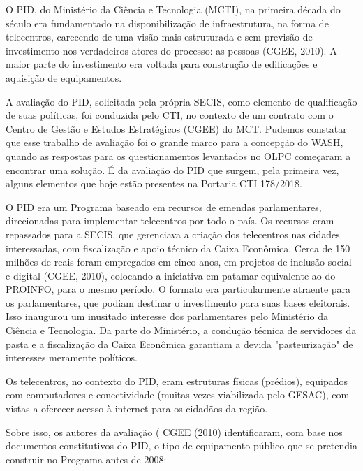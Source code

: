 O PID, do Ministério da Ciência e Tecnologia (MCTI), na primeira década do século era fundamentado na disponibilização de infraestrutura, na forma de telecentros, carecendo de uma visão mais estruturada e sem previsão de investimento nos verdadeiros atores do processo: as pessoas (CGEE, 2010). A maior parte do investimento era voltada para construção de edificações e aquisição de equipamentos.

A avaliação do PID, solicitada pela própria SECIS, como elemento de qualificação de suas políticas, foi conduzida pelo CTI, no contexto de um contrato com o Centro de Gestão e Estudos Estratégicos (CGEE) do MCT. Pudemos constatar que esse trabalho de avaliação foi o grande marco para a concepção do WASH, quando as respostas para os questionamentos levantados no OLPC começaram a encontrar uma solução. É da avaliação do PID que surgem, pela primeira vez, alguns elementos que hoje estão presentes na Portaria CTI 178/2018.

O PID era um Programa baseado em recursos de emendas parlamentares, direcionadas para implementar telecentros por todo o país. Os recursos eram repassados para a SECIS, que gerenciava a criação dos telecentros nas cidades interessadas, com fiscalização e apoio técnico da Caixa Econômica. Cerca de 150 milhões de reais foram empregados em cinco anos, em projetos de inclusão social e digital (CGEE, 2010), colocando a iniciativa em patamar equivalente ao do PROINFO, para o mesmo período. O formato era particularmente atraente para os parlamentares, que podiam destinar o investimento para suas bases eleitorais. Isso inaugurou um inusitado interesse dos parlamentares pelo Ministério da Ciência e Tecnologia. Da parte do Ministério, a condução técnica de servidores da pasta e a fiscalização da Caixa Econômica garantiam a devida "pasteurização" de interesses meramente políticos.

Os telecentros, no contexto do PID, eram estruturas físicas (prédios), equipados com computadores e conectividade (muitas vezes viabilizada pelo GESAC), com vistas a oferecer acesso à internet para os cidadãos da região.

Sobre isso, os autores da avaliação ( CGEE (2010) identificaram, com base nos documentos constitutivos do PID, o tipo de equipamento público que se pretendia construir no Programa antes de 2008:


\noindent\begin{center}\mbox{\centering{}}\end{center}


